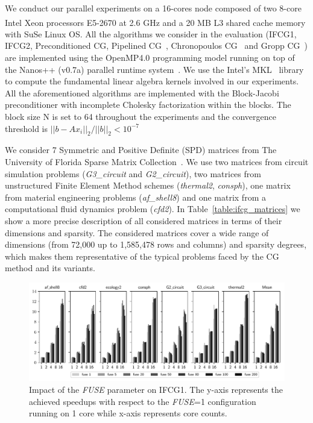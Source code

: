 %

We conduct our parallel experiments on a 16-cores node composed of two 8-core Intel Xeon\textsuperscript{\textregistered} processors E5-2670 at 2.6 GHz and a 20 MB L3 shared cache memory with SuSe Linux OS. 
All the algorithms we consider in the evaluation (IFCG1, IFCG2, Preconditioned CG, Pipelined CG~\cite{ghysels14}, Chronopoulos CG~\cite{chronopoulos89} and 
Gropp CG~\cite{gropp10}) are implemented using the OpenMP4.0 programming model running on top of the Nanos++ (v0.7a) parallel runtime system~\cite{nanos}. 
We use the Intel's MKL~\cite{mkl} library to compute the fundamental linear algebra kernels involved in our experiments. 
All the aforementioned algorithms are implemented with the Block-Jacobi preconditioner with incomplete Cholesky factorization within the blocks. The block size N is 
set to 64 throughout the experiments and the convergence threshold is $||b-Ax_{i}||_{2}/||b||_{2} < 10^{-7}$

We consider 7 Symmetric and Positive Definite (SPD) matrices from The University of Florida Sparse Matrix Collection~\cite{florida}.
We use two matrices from circuit simulation problems (\emph{G3\_circuit} and \emph{G2\_circuit}), two matrices from unstructured Finite Element Method schemes (\emph{thermal2}, \emph{consph}), one matrix from material engineering problems (\emph{af\_shell8}) and one matrix from a computational fluid dynamics problem (\emph{cfd2}). %
In Table~\ref{table:ifcg_matrices} we show a more precise description of all considered matrices in terms of their dimensions and sparsity.
The considered matrices cover a wide range of dimensions (from 72,000 up to 1,585,478 rows and columns) and sparsity degrees, which makes them representative of the typical problems faced by the CG method and its variants.


\begin{figure}[bhtp]
        \centerline{\includegraphics[width=\textwidth, trim={0cm 0 0cm 0},clip]{ifcg/figs/mn3_fuse/cg_speedup_bar_nd.pdf}}
        \caption{Impact of the \emph{FUSE} parameter on IFCG1. The y-axis represents the achieved speedups with respect to the \emph{FUSE}=1 configuration running on 1 core while x-axis represents core counts.}
        \label{fuse}
\end{figure}

